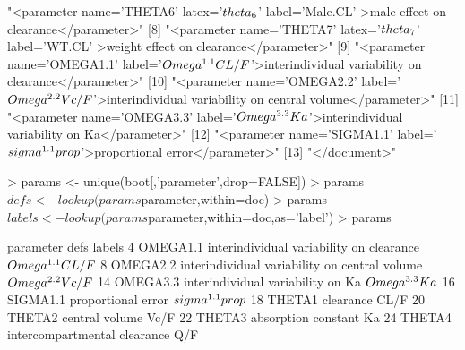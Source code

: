 \begin{Schunk}
\begin{Soutput}
 [7] "<parameter name='THETA6' latex='$\\theta_6$'                 label='Male.CL'                                >male effect on clearance</parameter>"          
 [8] "<parameter name='THETA7' latex='$\\theta_7$'                 label='WT.CL'                                  >weight effect on clearance</parameter>"        
 [9] "<parameter name='OMEGA1.1' label='$\\Omega^{1.1}CL/F$'>interindividual variability on clearance</parameter>"                                                
[10] "<parameter name='OMEGA2.2' label='$\\Omega^{2.2}Vc/F$'>interindividual variability on central volume</parameter>"                                           
[11] "<parameter name='OMEGA3.3' label='$\\Omega^{3.3}Ka$'>interindividual variability on Ka</parameter>"                                                         
[12] "<parameter name='SIGMA1.1' label='$\\sigma^{1.1}prop$'>proportional error</parameter>"                                                                      
[13] "</document>"                                                                                                                                                
\end{Soutput}
\begin{Sinput}
> params <- unique(boot[,'parameter',drop=FALSE])
> params$defs <- lookup(params$parameter,within=doc)
> params$labels <- lookup(params$parameter,within=doc,as='label')
> params
\end{Sinput}
\begin{Soutput}
   parameter                                          defs              labels
4   OMEGA1.1      interindividual variability on clearance $\\Omega^{1.1}CL/F$
8   OMEGA2.2 interindividual variability on central volume $\\Omega^{2.2}Vc/F$
14  OMEGA3.3             interindividual variability on Ka   $\\Omega^{3.3}Ka$
16  SIGMA1.1                            proportional error $\\sigma^{1.1}prop$
18    THETA1                                     clearance                CL/F
20    THETA2                                central volume                Vc/F
22    THETA3                           absorption constant                  Ka
24    THETA4                  intercompartmental clearance                 Q/F

\end{Soutput}
\end{Schunk}
